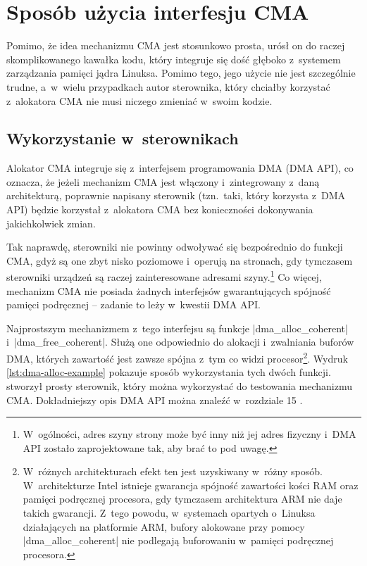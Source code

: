 \chapter{Sposób użycia interfesju CMA}\label{sec:cma-usage}

Pomimo, że idea mechanizmu CMA jest stosunkowo prosta, urósł on do
raczej skomplikowanego kawałka kodu, który integruje się dość głęboko
z~systemem zarządzania pamięci jądra Linuksa.  Pomimo tego, jego
użycie nie jest szczególnie trudne, a~w~wielu przypadkach autor
sterownika, który chciałby korzystać z~alokatora CMA nie musi niczego
zmieniać w~swoim kodzie.

\section{Wykorzystanie w~sterownikach}\label{sec:usage-drivers}

Alokator CMA integruje się z~interfejsem programowania DMA (DMA API),
co oznacza, że jeżeli mechanizm CMA jest włączony i~zintegrowany
z~daną architekturą, poprawnie napisany sterownik (tzn.\ taki, który
korzysta z~DMA API) będzie korzystał z~alokatora CMA bez konieczności
dokonywania jakichkolwiek zmian.

Tak naprawdę, sterowniki nie powinny odwoływać się bezpośrednio do
funkcji CMA, gdyż są one zbyt nisko poziomowe i~operują na stronach,
gdy tymczasem sterowniki urządzeń są raczej zainteresowane adresami
szyny.\footnote{W~ogólności, adres szyny strony może być inny niż jej
  adres fizyczny i~DMA API zostało zaprojektowane tak, aby brać to pod
  uwagę.}  Co więcej, mechanizm CMA nie posiada żadnych interfejsów
gwarantujących spójność pamięci podręcznej -- zadanie to leży
w~kwestii DMA API.

Najprostszym mechanizmem z~tego interfejsu są funkcje
\code|dma_alloc_coherent| i~\code|dma_free_coherent|.  Służą one
odpowiednio do alokacji i~zwalniania buforów DMA, których zawartość
jest zawsze spójna z~tym co widzi procesor\footnote{W~różnych
  architekturach efekt ten jest uzyskiwany w~różny sposób.
  W~architekturze Intel istnieje gwarancja spójność zawartości kości
  RAM oraz pamięci podręcznej procesora, gdy tymczasem architektura
  ARM nie daje takich gwarancji.  Z~tego powodu, w~systemach opartych
  o~Linuksa działających na platformie ARM, bufory alokowane przy
  pomocy \code|dma_alloc_coherent| nie podlegają buforowaniu w~pamięci
  podręcznej procesora.}.  Wydruk \ref{lst:dma-alloc-example} pokazuje
sposób wykorzystania tych dwóch funkcji.  \textcite{patch:cma-test}
stworzył prosty sterownik, który można wykorzystać do testowania
mechanizmu CMA.  Dokładniejszy opis DMA API można znaleźć w~rozdziale
15 \autocite{bib:ldd3}.

